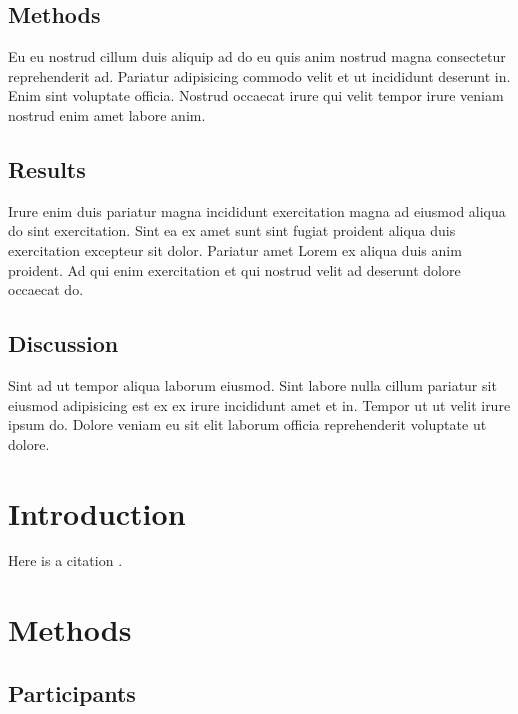 \documentclass[
  super,
  preprint,
  3p]{elsarticle}
\begin{document}
\hypertarget{methods}{%
\subsection{Methods}\label{methods}}

Eu eu nostrud cillum duis aliquip ad do eu quis anim nostrud magna
consectetur reprehenderit ad. Pariatur adipisicing commodo velit et ut
incididunt deserunt in. Enim sint voluptate officia. Nostrud occaecat
irure qui velit tempor irure veniam nostrud enim amet labore anim.

\hypertarget{results}{%
\subsection{Results}\label{results}}

Irure enim duis pariatur magna incididunt exercitation magna ad eiusmod
aliqua do sint exercitation. Sint ea ex amet sunt sint fugiat proident
aliqua duis exercitation excepteur sit dolor. Pariatur amet Lorem ex
aliqua duis anim proident. Ad qui enim exercitation et qui nostrud velit
ad deserunt dolore occaecat do.

\hypertarget{discussion}{%
\subsection{Discussion}\label{discussion}}

Sint ad ut tempor aliqua laborum eiusmod. Sint labore nulla cillum
pariatur sit eiusmod adipisicing est ex ex irure incididunt amet et in.
Tempor ut ut velit irure ipsum do. Dolore veniam eu sit elit laborum
officia reprehenderit voluptate ut dolore.

\newpage{}

\hypertarget{introduction}{%
\section{Introduction}\label{introduction}}

Here is a citation \citep{Marwick2017}.

\hypertarget{methods-1}{%
\section{Methods}\label{methods-1}}

\hypertarget{participants}{%
\subsection{Participants}\label{participants}}
\end{document}
